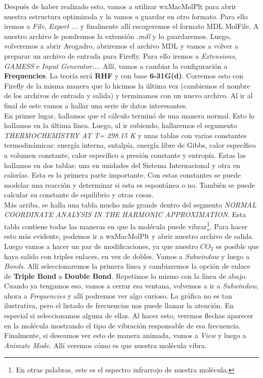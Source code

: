 \documentclass[10pt,letterpaper]{article}
\begin{document}
Despu\'es de haber realizado esto, vamos a utilizar wxMacMolPlt para abrir nuestra estructura optimizada y la vamos a guardar en otro formato. Para ello iremos a \textit{File}, \textit{Export ...} y finalmente all\'i escogeremos el formato MDL MolFile. A nuestro archivo le pondremos la extensi\'on \textit{.mdl} y lo guardaremos. Luego, volveremos a abrir Avogadro, abriremos el archivo MDL y vamos a volver a preparar un archivo de entrada para Firefly. Para ello iremos a \textit{Extensions}, \textit{GAMESS} e \textit{Input Generator...}. All\'i, vamos a cambiar la configuraci\'on a \textbf{Frequencies}. La teor\'ia ser\'a \textbf{RHF} y con base \textbf{6-31G(d)}. Corremos esto con Firefly de la misma manera que lo hicimos la \'ultima vez (cambiemos el nombre de los archivos de entrada y salida) y terminamos con un nuevo archivo. Al ir al final de este vamos a hallar una serie de datos interesantes.\\

En primer lugar, hallamos que el c\'alculo termin\'o de una manera normal. Esto lo hallamos en la \'ultima l\'inea. Luego, al ir subiendo, hallaremos el segumento \textit{THERMOCHEMISTRY AT T=  298.15 K} y unas tablas con varias constantes termodin\'amicas: energ\'ia interna, entalp\'ia, energ\'ia libre de Gibbs, calor espec\'ifico a volumen constante, calor espec\'ifico a presi\'on constante y entrop\'ia. Estas las hallamos en dos tablas: una en unidades del Sistema Internacional y otra en calor\'ias. Esta es la primera parte importante. Con estas constantes se puede modelar una reacci\'on y determinar si esta es espont\'anea o no. Tambi\'en se puede calcular su constante de equilibrio y otras cosas.\\

M\'as arriba, se halla una tabla mucho m\'as grande dentro del segmento \textit{NORMAL COORDINATE ANALYSIS IN THE HARMONIC APPROXIMATION}. Esta tabla contiene todas las maneras en que la mol\'ecula puede vibrar\footnote{En otras palabras, este es el espectro infrarrojo de nuestra mol\'ecula.}. Para hacer esto m\'as evidente, podemos ir a wxMacMolPlt y abrir nuestro archivo de salida. Luego vamos a hacer un par de modificaciones, ya que nuestro $CO_2$ es posible que haya salido con triples enlaces, en vez de dobles. Vamos a \textit{Subwindow} y luego a \textit{Bonds}. All\'i seleccionaremos la primera l\'inea y cambiaremos la opci\'on de enlace de \textbf{Triple Bond} a \textbf{Double Bond}. Repetimos lo mismo con la l\'inea de abajo. Cuando ya tengamos eso, vamos a cerrar esa ventana, volvemos a ir a \textit{Subwindow}, ahora a \textit{Frequencies} y all\'i podremos ver algo curioso. La gr\'afica no es tan ilustrativa, pero el listado de frecuencias nos puede llamar la atenci\'on. En especial si seleccionamos alguna de ellas. Al hacer esto, veremos flechas aparecer en la mol\'ecula mostrando el tipo de vibraci\'on responsable de esa frecuencia. Finalmente, si deseamos ver esto de manera animada, vamos a \textit{View} y luego a \textit{Animate Mode}. All\'i veremos c\'omo es que nuestra mol\'ecula vibra.\\
\end{document}
